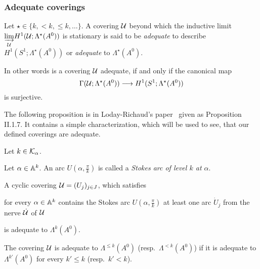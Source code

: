 \subsubsection{Adequate coverings}
\begin{defn}
  Let $\star\in\{k,<k,\leq k,\dots\}$.
  A covering $\mathcal{U}$ beyond which the inductive limit
  $\underset{\mathcal{U}}{\underrightarrow{\lim}}H^1(\mathcal{U};\Lambda^\star(A^0))$ is
  stationary is said to be \emph{adequate} to describe
  $H^1(S^1;\Lambda^\star(A^0))$ or \emph{adequate} to $\Lambda^\star(A^0)$.
  \begin{comment}
    A covering $\cU$ is said to be \emph{adequate} to describe
    $H^1(S^1;\Lambda^\star(A^0))$ or \emph{adequate} to $\Lambda^\star(A^0)$ if
    for every element in
    $\underset{\cU}{\underrightarrow{\lim}}H^1(\cU;\Lambda^\star(A^0))$
    given by some covering $\cU'$ and an element of
    $\Gamma(\cU';\Lambda^\star(A^0))$
    there exists
    \begin{itemize}
      \item an element in $\Gamma(\cU;\Lambda^\star(A^0))$ and
      \item an common refinement of $\cU$ and $\cU'$
    \end{itemize}
    such that \PROBLEM[the elements are~?? on the refined covering.]
  \end{comment}

  In other words is a covering $\mathcal{U}$ adequate, if and only if the canonical map
  \[
      \Gamma(\mathcal{U};\Lambda^\star(A^0))\longrightarrow H^1(S^1;\Lambda^\star(A^0))
  \]
  is surjective.
\end{defn}
The following proposition is in Loday-Richaud's paper~\cite{Loday1994} given as
Proposition II.1.7. It contains a simple characterization, which will be used
to see, that our defined coverings are adequate.
\begin{prop}\label{prop:adeqCovCondition}
  Let $k\in\mathcal{K}_\alpha$.
  \begin{s-defn}
    Let $\alpha\in\mathbb{A}^k$.
    An arc $U(\alpha,\frac{\pi}{k})$ is called a \emph{Stokes arc of level $k$
    at $\alpha$}.
  \end{s-defn}
  A cyclic covering $\mathcal{U}=(U_j)_{j\in J}$, which satisfies
  \begin{einr}
    for every $\alpha\in\mathbb{A}^k$ contains the Stokes arc $U(\alpha,\frac{\pi}{k})$
    at least one arc $\dot U_j$ from the nerve $\dot{\mathcal{U}}$ of $\mathcal{U}$
  \end{einr}
  is adequate to $\Lambda^k(A^0)$.

  The covering $\mathcal{U}$ is adequate to $\Lambda^{\leq k}(A^0)$ (resp.\
  $\Lambda^{<k}(A^0)$) if it is adequate to $\Lambda^{k'}(A^0)$ for every
  $k'\leq k$ (resp.\ $k'<k$).
\end{prop}

